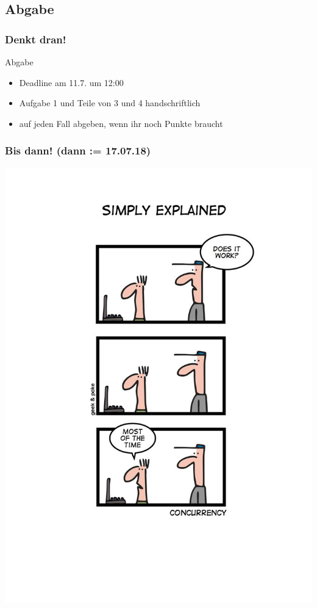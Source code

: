 \documentclass[18pt]{beamer}
\begin{document}
	\subsection{Abgabe}
	\begin{frame}
		\frametitle{Denkt dran!}
		\begin{alertblock}{Abgabe}
			\begin{itemize}
				\item Deadline am 11.7. um 12:00
				\item Aufgabe 1 und Teile von 3 und 4 handschriftlich
				\item auf jeden Fall abgeben, wenn ihr noch Punkte braucht
			\end{itemize}
		\end{alertblock}
	\end{frame}

	\begin{frame}
		\frametitle{Bis dann! (dann  := 17.07.18)}
		\centering
		\includegraphics[scale=1.0]{./comics/geek_and_poke_concurrency.jpg}
	\end{frame}
\end{document}
